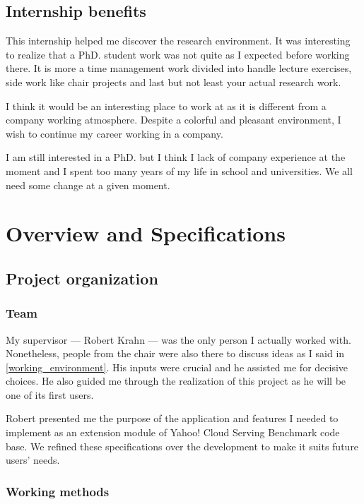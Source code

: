 \documentclass[a4paper,11pt]{report}
\begin{document}
\section{Internship benefits}

This internship helped me discover the research environment. It was interesting to realize that a PhD. student work was not quite as I expected before working there. It is more a time management work divided into handle lecture exercises, side work like chair projects and last but not least your actual research work.

I think it would be an interesting place to work at as it is different from a company working atmosphere. Despite a colorful and pleasant environment, I wish to continue my career working in a company. 

I am still interested in a PhD. but I think I lack of company experience at the moment and I spent too many years of my life in school and universities. We all need some change at a given moment.

\clearpage

\chapter{Overview and Specifications}

\section{Project organization}

\subsection{Team}

My supervisor --- Robert Krahn --- was the only person I actually worked with. Nonetheless, people from the chair were also there to discuss ideas as I said in \ref{working_environment}. His inputs were crucial and he assisted me for decisive choices. He also guided me through the realization of this project as he will be one of its first users.

Robert presented me the purpose of the application and features I needed to implement as an extension module of Yahoo! Cloud Serving Benchmark code base. We refined these specifications over the development to make it suits future users' needs.

\subsection{Working methods}\label{working_method}
\end{document}
